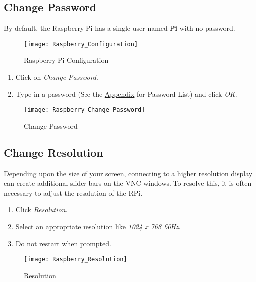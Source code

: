 \documentclass[
a4paper,
fontsize=14pt, %
pagesize, %
parskip=half-, %
]{scrartcl} %
\theoremstyle{mythmstyle} %
\begin{document}
\clearpage

\subsection{Change Password}
By default, the Raspberry Pi has a single user named \textbf{Pi} with no password.
\begin{figure}[h]
    \centering\texttt{[image: Raspberry\_Configuration]}
    \caption{Raspberry Pi Configuration}
\end{figure}
\begin{enumerate}
    \item Click on \emph{Change Password}.
    \clearpage
    \item Type in a password (See the \hyperlink{password}{Appendix} for Password List) and click \emph{OK}.
\end{enumerate}  

\begin{figure}[h]
    \centering\texttt{[image: Raspberry\_Change\_Password]}
    \caption{Change Password}
\end{figure}


\clearpage

\subsection{Change Resolution}
Depending upon the size of your screen, connecting to a higher resolution display can create additional slider bars on the VNC windows.  To resolve this, it is often necessary to adjust the resolution of the RPi.
\begin{enumerate}
    \item Click \emph{Resolution}.
    \item Select an appropriate resolution like \emph{1024 x 768 60Hz}.
    \item Do not restart when prompted.
\end{enumerate}
\begin{figure}[h]
    \centering\texttt{[image: Raspberry\_Resolution]}
    \caption{Resolution}
\end{figure}

\clearpage
\end{document}
